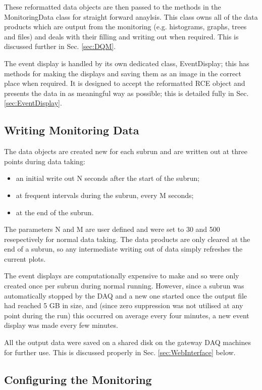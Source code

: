 These reformatted data objects are then passed to the methods in the MonitoringData class for straight forward anaylsis.  This class owns all of the data products which are output from the monitoring (e.g. histograms, graphs, trees and files) and deals with their filling and writing out when required.  This is discussed further in Sec. \ref{sec:DQM}.

The event display is handled by its own dedicated class, EventDisplay; this has methods for making the displays and saving them as an image in the correct place when required.  It is designed to accept the reformatted RCE object and presents the data in as meaningful way as possible; this is detailed fully in Sec. \ref{sec:EventDisplay}.

\subsection{Writing Monitoring Data}\label{sec:WritingMonitoringData}

The data objects are created new for each subrun and are written out at three points during data taking:
\begin{itemize}
\item an initial write out N seconds after the start of the subrun;
\item at frequent intervals during the subrun, every M seconds;
\item at the end of the subrun.
\end{itemize}
The parameters N and M are user defined and were set to 30 and 500 resepectively for normal data taking.  The data products are only cleared at the end of a subrun, so any intermediate writing out of data simply refreshes the current plots.

The event displays are computationally expensive to make and so were only created once per subrun during normal running.  However, since a subrun was automatically stopped by the DAQ and a new one started once the output file had reached 5 GB in size, and (since zero suppression was not utilised at any point during the run) this occurred on average every four minutes, a new event display was made every few minutes.

All the output data were saved on a shared disk on the gateway DAQ machines for further use.  This is discussed properly in Sec. \ref{sec:WebInterface} below.

\subsection{Configuring the Monitoring}\label{sec:MonitoringConfiguration}

